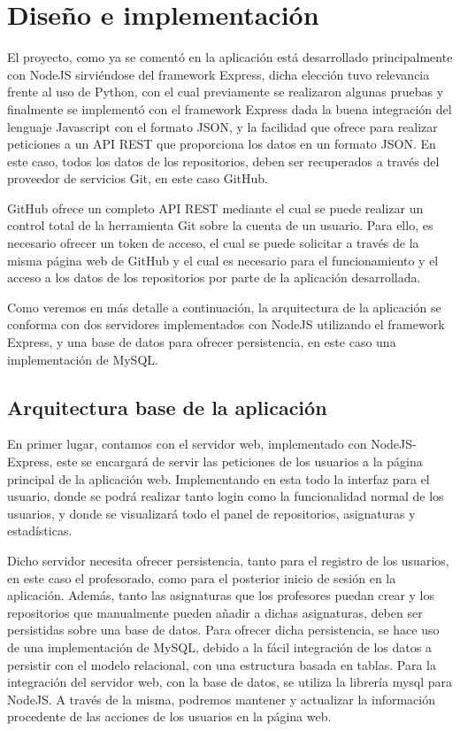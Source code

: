 \chapter{Diseño e implementación\label{05disenoTrabajo}}

El proyecto, como ya se comentó en la aplicación está desarrollado
principalmente con NodeJS sirviéndose del framework Express, dicha elección
tuvo relevancia frente al uso de Python, con el cual previamente se
realizaron algunas pruebas\cite{PhytonGithub,GitHubWrappers} y finalmente
se implementó con el framework Express dada la buena integración del
lenguaje Javascript con el formato JSON, y la facilidad que ofrece para
realizar peticiones a un API REST que proporciona los datos en un formato
JSON. En este caso, todos los datos de los repositorios, deben ser
recuperados a través del proveedor de servicios Git, en este caso GitHub.

GitHub ofrece un completo API REST mediante el cual se puede realizar un
control total de la herramienta Git sobre la cuenta de un usuario. Para
ello, es necesario ofrecer un token de acceso, el cual se puede solicitar a
través de la misma página web de GitHub y el cual es necesario para el
funcionamiento y el acceso a los datos de los repositorios por parte de la
aplicación desarrollada.

Como veremos en más detalle a continuación, la arquitectura de la
aplicación se conforma con dos servidores implementados con NodeJS
utilizando el framework Express, y una base de datos para ofrecer
persistencia, en este caso una implementación de MySQL.


\section{Arquitectura base de la aplicación}

En primer lugar, contamos con el servidor web, implementado con
NodeJS-Express, este se encargará de servir las peticiones de los usuarios
a la página principal de la aplicación web. Implementando en esta todo la
interfaz para el usuario, donde se podrá realizar tanto login como la
funcionalidad normal de los usuarios, y donde se visualizará todo el panel
de repositorios, asignaturas y estadísticas.

Dicho servidor necesita ofrecer persistencia, tanto para el registro de los
usuarios, en este caso el profesorado, como para el posterior inicio de
sesión en la aplicación. Además, tanto las asignaturas que los profesores
puedan crear y los repositorios que manualmente pueden añadir a dichas
asignaturas, deben ser persistidas sobre una base de datos. Para ofrecer
dicha persistencia, se hace uso de una implementación de MySQL, debido a la
fácil integración de los datos a persistir con el modelo relacional, con
una estructura basada en tablas. Para la integración del servidor web, con
la base de datos, se utiliza la librería mysql para NodeJS. A través de la
misma, podremos mantener y actualizar la información procedente de las
acciones de los usuarios en la página web.


